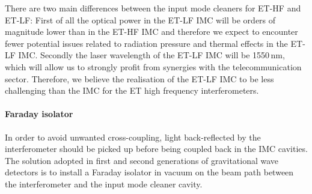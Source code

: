 
There are two main differences between the input mode cleaners for ET-HF and ET-LF:
First of all the optical power in the ET-LF IMC will be orders of magnitude
lower than in the ET-HF IMC and therefore we expect to encounter fewer potential issues
related to radiation pressure and thermal effects in the ET-LF IMC.
 Secondly the laser wavelength of the ET-LF IMC will
be 1550\,nm, which will allow us to strongly profit from
synergies with the telecommunication sector. Therefore, we believe the realisation
of the ET-LF IMC to be less challenging than the IMC for the ET high frequency interferometers.


\paragraph{Faraday isolator}

In order to avoid unwanted cross-coupling, light back-reflected by the interferometer should
be picked up before being coupled back in the IMC cavities. The solution adopted in first
and second generations of gravitational wave detectors is to install a Faraday isolator in
vacuum on the beam path between the interferometer and the input mode cleaner cavity.

